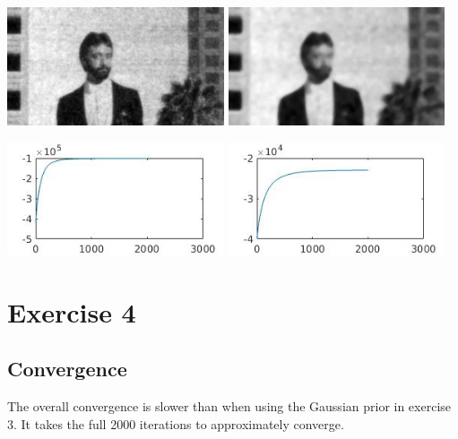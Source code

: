 \documentclass[a4paper,11pt, final]{scrartcl}
\begin{document}
{
\centering 
\includegraphics[width=0.48\textwidth]{ex3_image_mrf_gaussian_filter.png}
\includegraphics[width=0.48\textwidth]{ex3_image_median_into_mrf_gaussian_filter.png}
}

{
\centering 
\includegraphics[width=0.48\textwidth]{ex3_image_gauss_mrf_posterior.jpg}
\includegraphics[width=0.48\textwidth]{ex3_image_median_into_gauss_mrf_posterior.jpg}
}

\section*{Exercise 4}
\subsection*{Convergence}
The overall convergence is slower than when using the Gaussian prior in exercise 3. It takes the full 2000 iterations to approximately converge. 
\end{document}
